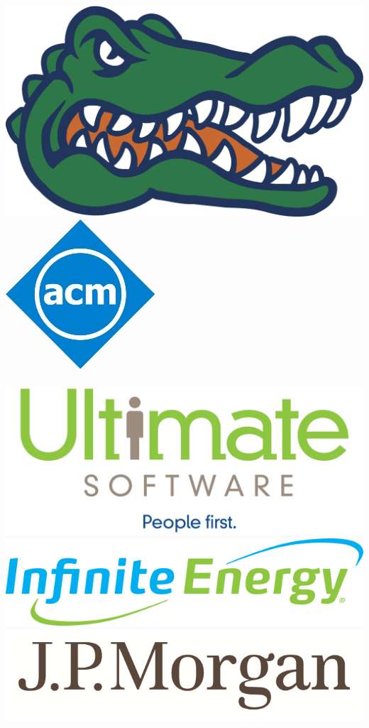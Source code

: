 \documentclass[a4paper,11pt]{article}
\begin{document}
\begin{center}

\end{center}
\vspace{-37mm}
\includegraphics[scale=0.18]{gator.jpg}
\hfill
\includegraphics[scale=3.7]{acm.jpg}
\\\\
\vspace{+5mm}
\includegraphics[scale=0.10]{us.png}
\includegraphics[scale=0.40]{ie.png}
\includegraphics[scale=0.85]{jpm.png}
\end{document}
